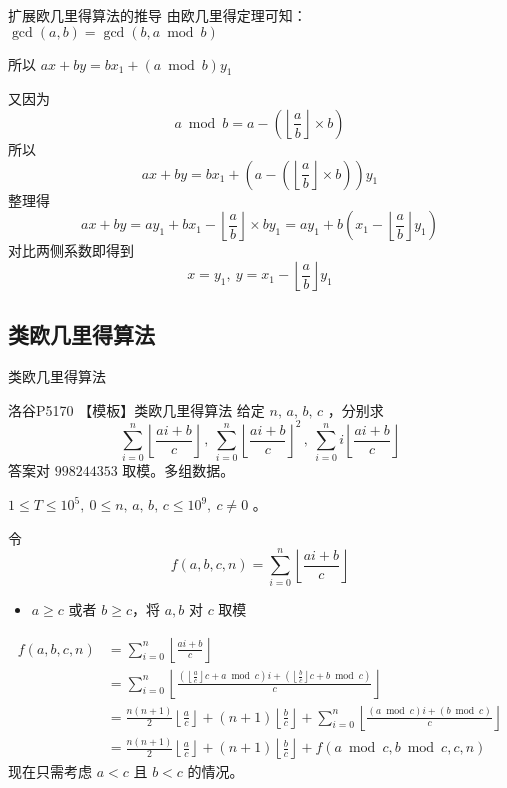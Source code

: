 \documentclass[UTF8]{beamer}
\begin{document}
    \begin{frame}{扩展欧几里得算法的推导}
    由欧几里得定理可知：$\gcd(a,b)=\gcd(b,a\bmod b)$

    所以 $ax+by=bx_1+(a\bmod b)y_1$

    又因为 
    $$
    a\bmod b=a-\left(\left\lfloor\frac{a}{b}\right\rfloor\times b\right)
    $$
    所以 
    $$
    ax+by=bx_1+\left(a-\left(\left\lfloor\frac{a}{b}\right\rfloor\times b\right)\right)y_1
    $$
    整理得
    $$
    ax+by=ay_1+bx_1-\left\lfloor\frac{a}{b}\right\rfloor\times by_1=ay_1+b\left(x_1-\left\lfloor\frac{a}{b}\right\rfloor y_1\right)
    $$
    对比两侧系数即得到
    $$
    x=y_1,\ y=x_1-\left\lfloor\frac{a}{b}\right\rfloor y_1
    $$
    \end{frame}

    \subsection{类欧几里得算法}
    \begin{frame}{类欧几里得算法}
        \begin{block}{洛谷P5170 【模板】类欧几里得算法}
            给定 $n,\,a,\,b,\,c$ ，分别求
            $$
            \sum_{i=0}^{n}\left\lfloor \frac{ai+b}{c} \right\rfloor\,,\  \sum_{i=0}^{n}{\left\lfloor \frac{ai+b}{c} \right\rfloor}^2\,,\  \sum_{i=0}^{n}i\left\lfloor \frac{ai+b}{c} \right\rfloor
            $$
            答案对 $998244353$ 取模。多组数据。

            $1 \leqslant T \leqslant 10^5,\ 0 \leqslant n,\,a,\,b,\,c \leqslant 10^9,\ c \neq 0$ 。
        \end{block}
    \end{frame}

    \begin{frame}
        令
        $$
        f(a,b,c,n)=\sum_{i=0}^n\left\lfloor \frac{ai+b}{c} \right\rfloor
        $$
        \begin{itemize}
            \item $a\ge c$ 或者 $b\ge c$，将 $a,b$ 对 $c$ 取模
        \end{itemize}
        $$
        \begin{aligned}
        f(a,b,c,n)&=\sum_{i=0}^n\left\lfloor \frac{ai+b}{c} \right\rfloor\\
        &=\sum_{i=0}^n\left\lfloor
        \frac{\left(\left\lfloor\frac{a}{c}\right\rfloor c+a\bmod c\right)i+\left(\left\lfloor\frac{b}{c}\right\rfloor c+b\bmod c\right)}{c}\right\rfloor\\
        &=\frac{n(n+1)}{2}\left\lfloor\frac{a}{c}\right\rfloor+(n+1)\left\lfloor\frac{b}{c}\right\rfloor+
        \sum_{i=0}^n\left\lfloor\frac{\left(a\bmod c\right)i+\left(b\bmod c\right)}{c}
        \right\rfloor\\
        &=\frac{n(n+1)}{2}\left\lfloor\frac{a}{c}\right\rfloor
        +(n+1)\left\lfloor\frac{b}{c}\right\rfloor+f(a\bmod c,b\bmod c,c,n)
        \end{aligned}
        $$
        现在只需考虑 $a<c$ 且 $b<c$ 的情况。
    \end{frame}
\end{document}
